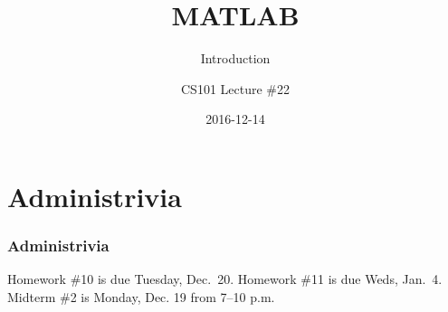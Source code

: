 \documentclass[11pt]{beamer}
\title{MATLAB}
\subtitle{Introduction}
\author{CS101 Lecture \#22}
\date{2016-12-14}
\begin{document}
  \setcounter{showProgressBar}{0}
  \setcounter{showSlideNumbers}{0}

\frame{\titlepage}

\setcounter{framenumber}{0}
\setcounter{showProgressBar}{1}
\setcounter{showSlideNumbers}{1}

\section{Administrivia}

\begin{frame}
  \frametitle{Administrivia}
  \Enlarge

   \begin{itemize}
   	\myitem  Homework \#10 is due Tuesday, Dec.\ 20.
   	\myitem Homework \#11 is due Weds, Jan.\ 4.
   	\myitem  Midterm \#2 is Monday, Dec. 19 from 7–10 p.m.
   \end{itemize}
\end{frame}
\end{document}
